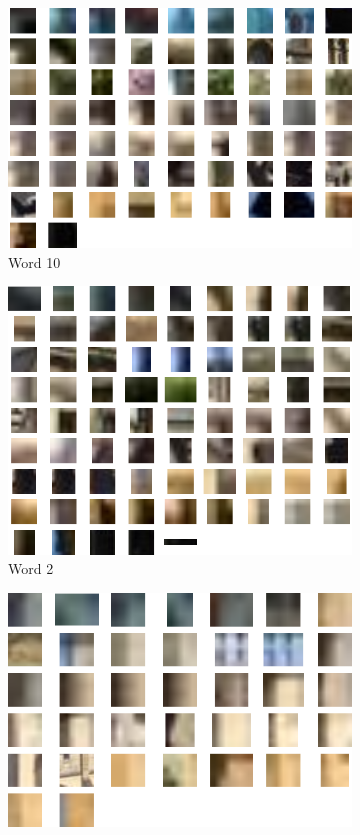 \documentclass[a4paper,10pt,twoside]{article}
\begin{document}
\begin{figure}
\begin{subfigure}{0.49\textwidth}
    \centering
    \includegraphics[width=\textwidth,height=.3\textheight,keepaspectratio]{word3}
    \caption{Word 10}
  \end{subfigure}
  \begin{subfigure}{0.49\textwidth}
    \centering
    \includegraphics[width=\textwidth,height=.3\textheight,keepaspectratio]{word4}
    \caption{Word 2}
  \end{subfigure}
  \begin{subfigure}{0.49\textwidth}
    \centering
    \includegraphics[width=\textwidth,height=.3\textheight,keepaspectratio]{word5}

\end{subfigure}
\end{figure}
\end{document}
